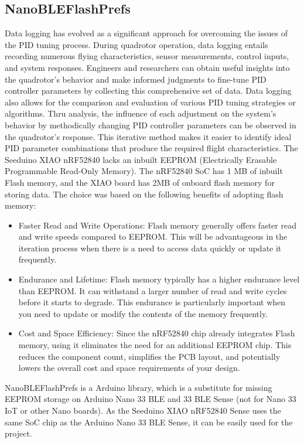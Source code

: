 \subsection{NanoBLEFlashPrefs}
Data logging has evolved as a significant approach for overcoming the issues of the PID tuning process. \cite{PIDlog}
During quadrotor operation, data logging entails recording numerous flying characteristics, sensor measurements, control inputs, and system responses.
Engineers and researchers can obtain useful insights into the quadrotor's behavior and make informed judgments to fine-tune PID controller parameters by collecting this comprehensive set of data. \cite{loggingProof}
Data logging also allows for the comparison and evaluation of various PID tuning strategies or algorithms. 
Thru analysis, the influence of each adjustment on the system's behavior by methodically changing PID controller parameters can be observed in the quadrotor's response.
This iterative method makes it easier to identify ideal PID parameter combinations that produce the required flight characteristics.
The Seeduino XIAO nRF52840 lacks an inbuilt EEPROM (Electrically Erasable Programmable Read-Only Memory). The nRF52840 SoC has 1 MB of inbuilt Flash memory, and the XIAO board has 2MB of onboard flash memory for storing data. The choice was based on the following benefits of adopting flash memory:
\begin{itemize}
    \item
        Faster Read and Write Operations: Flash memory generally offers faster read and write speeds compared to EEPROM. This will be advantageous in the iteration process when there is a need to access data quickly or update it frequently.
    \item
    	Endurance and Lifetime: Flash memory typically has a higher endurance level than EEPROM. It can withstand a larger number of read and write cycles before it starts to degrade. This endurance is particularly important when you need to update or modify the contents of the memory frequently.
    \item
    	Cost and Space Efficiency: Since the nRF52840 chip already integrates Flash memory, using it eliminates the need for an additional EEPROM chip. This reduces the component count, simplifies the PCB layout, and potentially lowers the overall cost and space requirements of your design.
\end{itemize}
NanoBLEFlashPrefs is a Arduino library, which is a substitute for missing EEPROM storage on Arduino Nano 33 BLE and 33 BLE Sense (not for Nano 33 IoT or other Nano boards). \cite{FlashPrefs}
As the Seeduino XIAO nRF52840 Sense uses the same SoC chip as the Arduino Nano 33 BLE Sense, it can be easily used for the project. \cite{Nano33} \cite{wikiSeeed}

